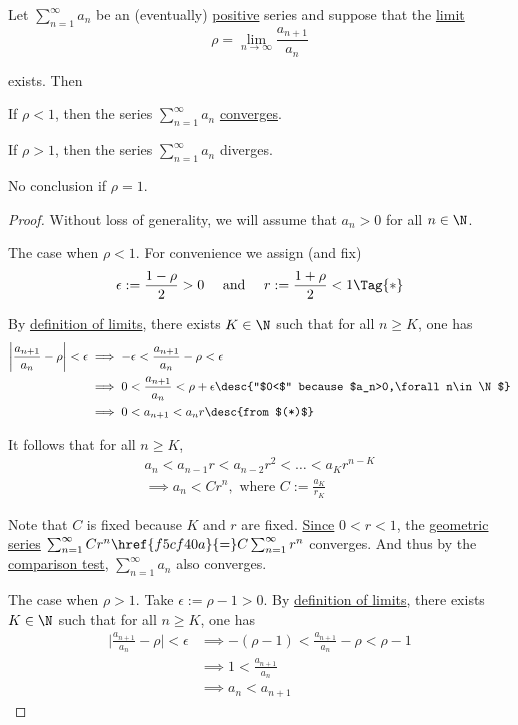 \label{cb7b15b}

Let $\sum_{n=1}^\infty a_n$ be an (eventually) \href{c09906a}{positive} series
and suppose that the \href{e565120}{limit}
$$
  \rho=\lim_{n\to\infty}\frac{a_{n+1}}{a_n}
$$

exists. Then
\begin{enumerati}
  \item If $\rho<1$, then the series $\sum_{n=1}^\infty a_n$
        \href{f8901df}{converges}.
  \item If $\rho>1$, then the series $\sum_{n=1}^\infty a_n$ diverges.
  \item No conclusion if $\rho=1$.
\end{enumerati}

\begin{proof}
  Without loss of generality, we will assume that $a_n>0$ for all $n\in\N$.

   The case when $\rho<1$. For convenience we assign (and fix)
  \begin{equation*}
    \epsilon:=\frac{1-\rho}2>0\quad\text{ and }\quad r:=\frac{1+\rho}2<1\Tag{*}
  \end{equation*}

  By \href{e565120}{definition of limits}, there exists $K\in\N$ such that for
  all $n\geq K$, one has
  \begin{align*}
    \biggl|\frac{a_{n+1}}{a_n}-\rho\biggr|<\epsilon
     &\implies-\epsilon<\frac{a_{n+1}}{a_n}-\rho<\epsilon                                      \\
     &\implies0<\frac{a_{n+1}}{a_n}<\rho+\epsilon\desc{``$0<$" because $a_n>0,\forall n\in\N$} \\
     &\implies0<a_{n+1}<a_nr\desc{from $(*)$}
  \end{align*}

  It follows that for all $n\geq K$,
  \begin{gather*}
    a_n<a_{n-1}r<a_{n-2}r^2<\ldots<a_Kr^{n-K}\\
    \implies a_n<Cr^n, \text{ where } C:=\frac{a_K}{r_K}
  \end{gather*}

  Note that $C$ is fixed because $K$ and $r$ are fixed. \href{fca26f6}{Since}
  $0<r<1$, the \href{ae21a85}{geometric series} $\sum_{n=1}^\infty
  Cr^n\href{f5cf40a}{=}C\sum_{n=1}^\infty r^n$ converges. And thus by the
  \href{d0856d6}{comparison test}, $\sum_{n=1}^\infty a_n$ also converges.

   The case when $\rho>1$. Take $\epsilon:=\rho-1>0$. By
  \href{e565120}{definition of limits}, there exists $K\in\N$ such that for all
  $n\geq K$, one has
  \begin{align*}
    \biggl|\frac{a_{n+1}}{a_n}-\rho\biggr|<\epsilon
     &\implies-(\rho-1)<\frac{a_{n+1}}{a_n}-\rho<\rho-1 \\
     &\implies1<\frac{a_{n+1}}{a_n}                     \\
     &\implies a_n<a_{n+1}
  \end{align*}


\end{proof}
